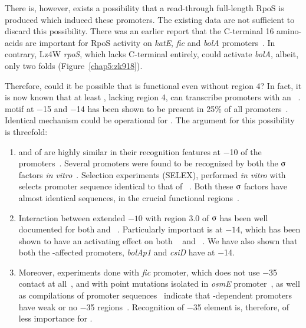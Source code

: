 There is, however, exists a possibility that a read-through
full-length RpoS is produced which induced these promoters. The
existing data are not sufficient to discard this possibility.
There was an earlier report that the C-terminal 16 amino-acids are
important for  RpoS activity on \emph{katE}, \emph{fic}
and \emph{bolA} promoters~\citep{Ohnuma2000}. In contrary, Lz4W
\emph{rpoS}, which lacks C-terminal entirely, could activate
\emph{bolA}, albeit, only two folds (Figure~\ref{chap5:zk918}).

Therefore, could it be possible that \lzsig{} is functional even
without region 4? In fact, it is now known that at least \siga{},
lacking region 4, can transcribe promoters with an ~\citep[,][]{Keilty1987,Kumar1993,Campbell2002}\@.
 motif at $-$15 and $-$14 has been shown to be present in
25\% of all  promoters~\citep{Burr2000}. Identical
mechanism could be operational for \sigs{}. The argument for this
possibility is threefold:

\begin{enumerate}

\item \siga{} and \sigs of  are highly similar in their
recognition features at $-$10 of the promoters~\citep{Lee2001}.
Several  promoters were found to be recognized by both
the $\sigmaup$ factors \emph{in
vitro}~\citep{Tanaka1993,Tanaka1995}. Selection experiments
(SELEX), performed \emph{in vitro} with  \sigs{} selects
promoter sequence identical to that of \siga{}~\citep{Gaal2001}.
Both these $\sigmaup$ factors have almost identical sequences, in
the crucial functional regions~\citep{Lonetto1992,Gruber1997}.


\item Interaction between extended $-10$ with region 3.0 of
$\sigmaup$ has been well documented for both \siga{} and
\sigs{}~\citep{Voskuil1995,
Barne1997,Becker1999,Colland1999,Burr2000,Becker2001}.
Particularly important is  at $-14$,  which has been shown
to have an activating effect on both \siga{}~\citep{Barne1997} and
\sigs{}~\citep{Becker2001}. We have also shown that both the
\lzsig{}-affected promoters, \emph{bolAp1} and \emph{csiD} have
 at $-$14.

\item Moreover, experiments done with \emph{fic} promoter, which
does not use $-$35 contact at all~\citep{Tanaka1995}, and with
point mutations isolated in \emph{osmE}
promoter~\citep{Bordes2000}, as well as compilations of promoter
sequences~\citep{Espinosa1996} indicate that \sigs-dependent
promoters have weak or no $-$35 regions~\citep{Becker2001}.
Recognition of $-$35 element is, therefore, of less importance for
\sigs.

\end{enumerate}

